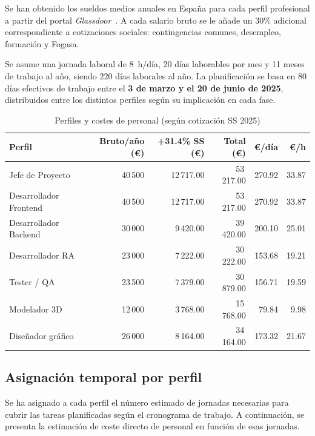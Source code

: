 Se han obtenido los sueldos medios anuales en España para cada perfil profesional a partir del portal \textit{Glassdoor}~\cite{glassdoorJefeProyecto,glassdoorFrontend,glassdoorBackend,glassdoorTester,glassdoorModelador3D,glassdoorDiseñadr,glassdoorARDeveloper}. A cada salario bruto se le añade un 30\% adicional correspondiente a cotizaciones sociales: contingencias comunes, desempleo, formación y Fogasa.

Se asume una jornada laboral de 8~h/día, 20 días laborables por mes y 11 meses de trabajo al año, siendo 220 días laborales al año. La planificación se basa en 80 días efectivos de trabajo entre el \textbf{3 de marzo y el 20 de junio de 2025}, distribuidos entre los distintos perfiles según su implicación en cada fase.

\begin{table}[H]
\centering
\caption{Perfiles y costes de personal (según cotización SS 2025)}
\begin{tabular}{|l|r|r|r|r|r|}
\hline
\textbf{Perfil} & \textbf{Bruto/año (€)} & \textbf{+31.4\% SS (€)} & \textbf{Total (€)} & \textbf{€/día} & \textbf{€/h} \\
\hline
Jefe de Proyecto        & 40\,500 & 12\,717.00 & 53\,217.00 & 270.92 & 33.87 \\
Desarrollador Frontend  & 40\,500 & 12\,717.00 & 53\,217.00 & 270.92 & 33.87 \\
Desarrollador Backend   & 30\,000 & 9\,420.00  & 39\,420.00 & 200.10 & 25.01 \\
Desarrollador RA        & 23\,000 & 7\,222.00  & 30\,222.00 & 153.68 & 19.21 \\
Tester / QA             & 23\,500 & 7\,379.00  & 30\,879.00 & 156.71 & 19.59 \\
Modelador 3D            & 12\,000 & 3\,768.00  & 15\,768.00 & 79.84  & 9.98  \\
Diseñador gráfico       & 26\,000 & 8\,164.00  & 34\,164.00 & 173.32 & 21.67 \\
\hline
\end{tabular}
\end{table}



\subsection{Asignación temporal por perfil}

Se ha asignado a cada perfil el número estimado de jornadas necesarias para cubrir las tareas planificadas según el cronograma de trabajo. A continuación, se presenta la estimación de coste directo de personal en función de esas jornadas.

